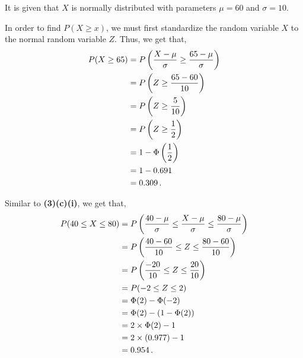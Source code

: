 \begin{subquestions}
\subquestion

It is given that $X$ is normally distributed with parameters $\mu = 60$ and $\sigma = 10$.
\begin{subsubquestions}
	
\subsubquestion

In order to find $P(X \geq x)$, we must first standardize the random variable $X$ to the normal random variable $Z$. Thus, we get that,
\begin{align}
	P(X \geq 65) & = P\left( \frac{X-\mu}{\sigma} \geq \frac{65-\mu}{\sigma} \right) \nonumber \\
	             & = P\left(Z \geq \frac{65-60}{10} \right) \nonumber \\
	             & = P\left(Z \geq \frac{5}{10} \right) \nonumber \\
	             & = P\left(Z \geq \frac{1}{2} \right) \nonumber \\
	             & = 1 - \Phi\left(\frac{1}{2} \right) \nonumber \\
	             & = 1 - 0.691 \nonumber \\
	             & = 0.309 \,.	
\end{align}


\subsubquestion

Similar to \textbf{(3)(c)(i)}, we get that,
\begin{align}
	P(40 \leq X \leq 80) & = P \left( \frac{40-\mu}{\sigma} \leq \frac{X-\mu}{\sigma} \leq \frac{80-\mu}{\sigma} \right) \nonumber \\
	                     & = P \left( \frac{40-60}{10} \leq Z \leq \frac{80-60}{10} \right) \nonumber \\
	                     & = P \left( \frac{-20}{10} \leq Z \leq \frac{20}{10} \right) \nonumber \\
						 & = P(-2 \leq Z \leq 2) \nonumber \\
						 & = \Phi(2) - \Phi(-2) \nonumber \\
						 & = \Phi(2) - (1 - \Phi(2)) \nonumber \\
						 & = 2 \times \Phi(2) - 1 \nonumber \\
						 & = 2 \times (0.977) - 1 \nonumber \\
						 & = 0.954 \,.
\end{align}


\end{subsubquestions}

\end{subquestions}

